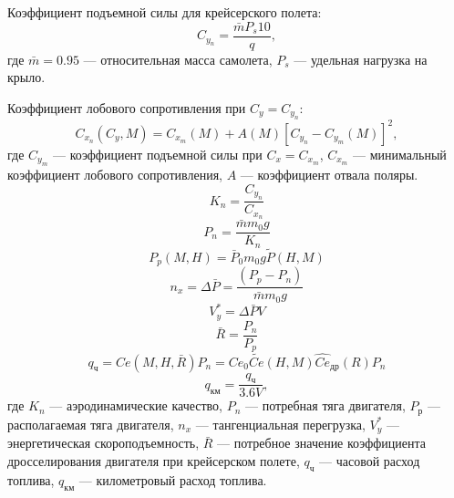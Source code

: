 Коэффициент подъемной силы для крейсерского полета:  
\begin{equation}
    C_{y_n} = \frac{\bar{m} P_s 10}{q},
    \label{eq:c_y_n}
\end{equation}
где $\bar{m} = 0.95$ --- относительная масса самолета, $P_s$ --- удельная 
нагрузка на крыло.

Коэффициент лобового сопротивления при $C_y = C_{y_n}$:
\begin{equation}
    C_{x_n}(C_y, M) = C_{x_m}(M) + A(M) \left[ C_{y_n} - C_{y_m}(M)\right]^2,
    \label{eq:c_x_n}
\end{equation}
где $C_{y_m}$ --- коэффициент подъемной силы при $C_x = C_{x_m}$, $C_{x_m}$ ---
минимальный коэффициент лобового сопротивления, $A$ --- коэффициент отвала
поляры.
\begin{equation}
    K_n = \frac{C_{y_n}}{C_{x_n}}
    \label{eq:K_n}
\end{equation}
\begin{equation}
    P_n = \frac{\bar{m} m_0 g}{K_n}
    \label{eq:P_potr}
\end{equation}
\begin{equation}
    P_p(M,H) = \bar{P}_0 m_0 g \tilde{P}(H,M)
    \label{eq:P_rasp}
\end{equation}
\begin{equation}
    n_x = \Delta \bar{P} = \frac{(P_p - P_n)}{\bar{m} m_0 g}
    \label{eq:n_x}
\end{equation}
\begin{equation}
    V_y^* = \Delta \bar{P} V
    \label{eq:Vy}
\end{equation}
\begin{equation}
    \bar{R} = \frac{P_n}{P_p}
    \label{eq:R_dross}
\end{equation}
\begin{equation}
    q_{ч} = Ce(M,H,\bar{R})P_n = Ce_0 \tilde{Ce}(H,M) \hat{Ce}_{др}(R) P_n
    \label{eq:q_chas}
\end{equation}
\begin{equation}
    q_{км} = \frac{q_{ч}}{3.6V},
    \label{eq:q_km}
\end{equation}
где $K_n$ --- аэродинамические качество, $P_n$ --- потребная тяга двигателя,
$P_р$ --- располагаемая тяга двигателя, $n_x$ --- тангенциальная перегрузка,
$V_y^*$ --- энергетическая скороподъемность, $\bar{R}$ --- потребное значение
коэффициента дросселирования двигателя при крейсерском полете, $q_{ч}$ ---
часовой расход топлива, $q_{км}$ --- километровый расход топлива.

